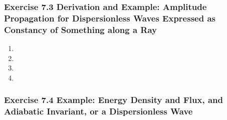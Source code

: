 \documentclass[10pt,a4paper]{book}
\theoremstyle{definition}
\begin{document}
\subsubsection{Exercise 7.3 Derivation and Example: Amplitude Propagation for Dispersionless Waves Expressed as Constancy of Something along a Ray}
\begin{enumerate}[label=(\alph*)]
\item
\item
\item
\item
\end{enumerate}

\subsubsection{Exercise 7.4 Example: Energy Density and Flux, and Adiabatic Invariant, or a Dispersionless Wave}
\end{document}
